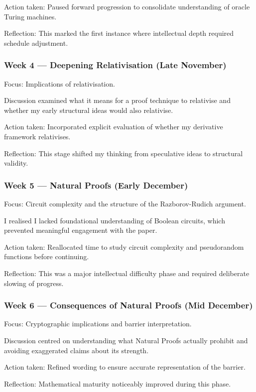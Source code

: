 \documentclass[12pt]{article}
\begin{document}
Action taken: Paused forward progression to consolidate understanding of oracle Turing machines.

Reflection: This marked the first instance where intellectual depth required schedule adjustment.

\subsubsection*{Week 4 --- Deepening Relativisation (Late November)}

Focus: Implications of relativisation.

Discussion examined what it means for a proof technique to relativise and whether my early structural ideas would also relativise.

Action taken: Incorporated explicit evaluation of whether my derivative framework relativises.

Reflection: This stage shifted my thinking from speculative ideas to structural validity.

\subsubsection*{Week 5 --- Natural Proofs (Early December)}

Focus: Circuit complexity and the structure of the Razborov-Rudich argument.

I realised I lacked foundational understanding of Boolean circuits, which prevented meaningful engagement with the paper.

Action taken: Reallocated time to study circuit complexity and pseudorandom functions before continuing.

Reflection: This was a major intellectual difficulty phase and required deliberate slowing of progress.

\subsubsection*{Week 6 --- Consequences of Natural Proofs (Mid December)}

Focus: Cryptographic implications and barrier interpretation.

Discussion centred on understanding what Natural Proofs actually prohibit and avoiding exaggerated claims about its strength.

Action taken: Refined wording to ensure accurate representation of the barrier.

Reflection: Mathematical maturity noticeably improved during this phase.
\end{document}
